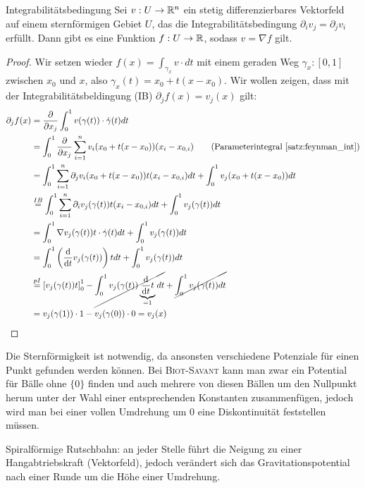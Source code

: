 \begin{satz}{Integrabilitätsbedingung}{}
Sei $v : U \to \mathbb{R}^n$ ein stetig differenzierbares Vektorfeld auf einem sternförmigen Gebiet $U$, das die Integrabilitätsbedingung $\partial_iv_j = \partial_jv_i$ erfüllt. Dann gibt es eine Funktion $f:U\to \mathbb{R}$, sodass $v = \nabla f$ gilt.
\end{satz}
\begin{proof}
Wir setzen wieder $f(x) = \int_{\gamma_x}v\cdot dt$ mit einem geraden Weg $\gamma_x:[0,1]$ zwischen $x_0$ und $x$, also $\gamma_x(t) = x_0 + t(x-x_0)$. Wir wollen zeigen, dass mit der Integrabilitätsbeldingung (IB) $\partial_jf(x) = v_j(x)$ gilt:
\begin{align*}
    \partial_jf(x) &= \diffp{}{x_j}\int_0^1v(\gamma(t))\cdot\Dot{\gamma}(t) dt\\
    &=\int_0^1\diffp{}{x_j}\sum_{i=1}^nv_i(x_0+t(x-x_0))(x_i-x_{0,i}) \qquad\text{(Parameterintegral \ref{satz:feynman_int})}\\
    &=\int_0^1 \sum_{i=1}^n\partial_jv_i(x_0+t(x-x_0))t(x_i-x_{0,i})dt + \int_0^1v_j(x_0+t(x-x_0))dt\\
    &\stackrel{IB}{=} \int_0^1 \sum_{i=1}^n\partial_iv_j(\gamma(t))t(x_i-x_{0,i})dt + \int_0^1v_j(\gamma(t))dt\\
    &=\int_0^1\nabla v_j(\gamma(t))t\cdot\Dot{\gamma}(t)dt + \int_0^1v_j(\gamma(t))dt\\
    &=\int_0^1\bk{\diff{}{t} v_j(\gamma(t))}tdt + \int_0^1v_j(\gamma(t))dt\\
    &\stackrel{pI}{=}\sbk{v_j(\gamma(t))t}_0^1 - \cancel{\int_0^1v_j(\gamma(t))\underbrace{\diff{}{t}t}_{=1}dt}+\cancel{\int_0^1v_j(\gamma(t))dt}\\
    &= v_j(\gamma(1))\cdot 1-v_j(\gamma(0))\cdot 0 =v_j(x)
\end{align*}
\end{proof}

Die Sternförmigkeit ist notwendig, da ansonsten verschiedene Potenziale für einen Punkt gefunden werden können. Bei \textsc{Biot-Savant} kann man zwar ein Potential für Bälle ohne $\{0\}$ finden und auch mehrere von diesen Bällen um den Nullpunkt herum unter der Wahl einer entsprechenden Konstanten zusammenfügen, jedoch wird man bei einer vollen Umdrehung um $0$ eine Diskontinuität feststellen müssen.

\begin{example} Spiralförmige Rutschbahn: an jeder Stelle führt die Neigung zu einer Hangabtriebskraft (Vektorfeld), jedoch verändert sich das Gravitationspotential nach einer Runde um die Höhe einer Umdrehung.
\end{example}

